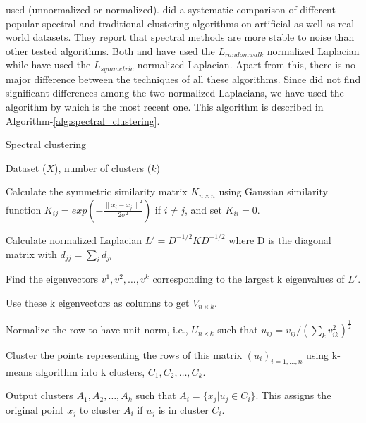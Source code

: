 used (unnormalized or normalized). \citet{verma2003comparison} did a systematic comparison of different popular 
spectral \citep{shi00normalized, ng2001onspectral, meila2000learning} and traditional clustering algorithms on artificial as well as 
real-world datasets. They report that spectral methods are more stable to noise than other tested algorithms. 
Both \citet{shi00normalized} and \citet{meila2000learning} have used the $L_{random walk}$ normalized Laplacian while \citet{ng2001onspectral} 
have used the $L_{symmetric}$ normalized Laplacian. Apart from this, there is no major difference between the techniques of all these algorithms. 
Since \citet{verma2003comparison} did not find significant differences among the two normalized Laplacians, we have used the 
algorithm by \citet{ng2001onspectral} which is the most recent one. This algorithm is described in Algorithm-\ref{alg:spectral_clustering}.
\begin{algorithm}
\caption{Spectral clustering}
\label{alg:spectral_clustering}
\begin{algorithmic}[1]
\REQUIRE Dataset ($X$), number of clusters ($k$) 

\STATE Calculate the symmetric similarity matrix $K_{n \times n}$  using Gaussian similarity function  $K_{ij}=exp \left( -\frac{{\parallel x_{i}-x_{j} \parallel}^{2}}{2\sigma^{2}}\right)$ if $i\neq j$, and set $K_{ii}=0$. 

\STATE Calculate normalized Laplacian $L'=D^{-1/2}KD^{-1/2}$ where D is the diagonal matrix with $d_{jj}=\sum_{i}d_{ji}$ 

\STATE Find the eigenvectors $v^{1},v^{2},\dots,v^{k}$ corresponding to the largest k eigenvalues of $L'$. 

\STATE Use these k eigenvectors as columns to get $V_{n \times k}$. 

\STATE Normalize the row to have unit norm, i.e., $U_{n \times k}$ such that $u_{ij}= v_{ij}/(\sum_{k}{v_{ik}^{2}})^{\frac{1}{2}}$

\STATE Cluster the points representing the rows of this matrix $(u_{i})_{i=1,...,n}$ using k-means algorithm into k clusters, $C_{1},C_{2},\dots,C_{k}$.  

\STATE Output clusters $A_{1},A_{2},\dots,A_{k}$ such that $A_{i}=\{x_{j}|u_{j}\in C_{i}\}$. This assigns the original point $x_{j}$ to cluster $A_{i}$ if $u_{j}$ is in cluster $C_{i}$. 

\end{algorithmic}
\end{algorithm}


